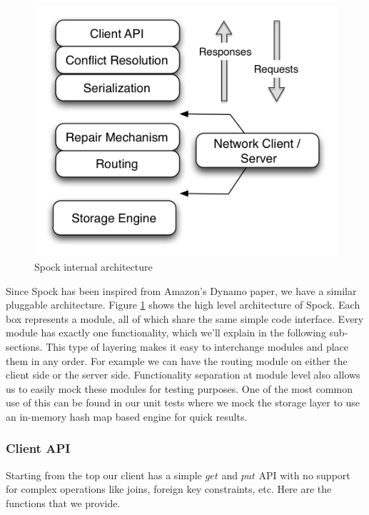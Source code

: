 \documentclass[twocolumn]{article}
\newcommand{\projectname}{Spock}
\begin{document}
\begin{figure}
  \centering
    \includegraphics[scale=0.45]{images/arch.png}
  \caption{\projectname{} internal architecture}
  \label{arch}
\end{figure}


Since \projectname{} has been inspired from Amazon's Dynamo paper, we have a similar pluggable architecture. Figure \ref{arch} shows the high level architecture of \projectname{}. Each box represents a module, all of which share the same simple code interface. Every module has exactly one functionality, which we'll explain in the following sub-sections. This type of layering makes it easy to interchange modules and place them in any order. For example we can have the routing module on either the client side or the server side. Functionality separation at module level also allows us to easily mock these modules for testing purposes. One of the most common use of this can be found in our unit tests where we mock the storage layer to use an in-memory hash map based engine for quick results.  


\subsubsection {Client API }  
\label{sec:system_architecture:system_components:client_api}

Starting from the top our client has a simple $get$ and $put$ API with no support for complex operations like joins, foreign key constraints, etc. Here are the functions that we provide. 
\end{document}
